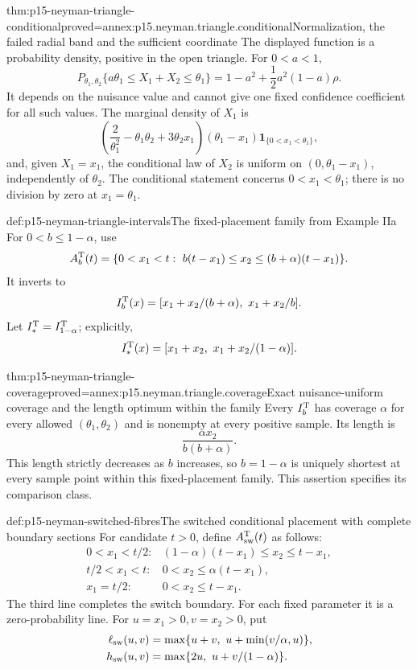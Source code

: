\begin{hbtheorem}{thm:p15-neyman-triangle-conditional}{proved=annex:p15.neyman.triangle.conditional}{Normalization, the failed radial band and the sufficient coordinate}
The displayed function is a probability density, positive in the
open triangle. For \(0<a<1\),
\[
 P_{\theta_1,\theta_2}\{a\theta_1\leq X_1+X_2\leq\theta_1\}
             =1-a^2+\frac12a^2(1-a)\rho.
\]
It depends on the nuisance value and cannot give one fixed
confidence coefficient for all such values.
The marginal density of \(X_1\) is
\[
 \left(\frac2{\theta_1^2}-\theta_1\theta_2+3\theta_2x_1\right)
                      (\theta_1-x_1)\mathbf1_{\{0<x_1<\theta_1\}},
\]
and, given \(X_1=x_1\), the conditional law of \(X_2\) is
uniform on \((0,\theta_1-x_1)\), independently of \(\theta_2\).
The conditional statement concerns \(0<x_1<\theta_1\);
there is no division by zero at \(x_1=\theta_1\).
\end{hbtheorem}

\begin{hbdefinition}{def:p15-neyman-triangle-intervals}{The fixed-placement family from Example IIa}
For \(0<b\leq1-\alpha\), use
\[
 A_b^{\rm T}(t)=
 \{0<x_1<t:\ b(t-x_1)\leq x_2\leq(b+\alpha)(t-x_1)\}.
\]
It inverts to
\[
             I_b^{\rm T}(x)=
                [x_1+x_2/(b+\alpha),\ x_1+x_2/b].
\]
Let \(I_*^{\rm T}=I_{1-\alpha}^{\rm T}\); explicitly,
\[
             I_*^{\rm T}(x)=[x_1+x_2,\ x_1+x_2/(1-\alpha)].
\]
\end{hbdefinition}

\begin{hbtheorem}{thm:p15-neyman-triangle-coverage}{proved=annex:p15.neyman.triangle.coverage}{Exact nuisance-uniform coverage and the length optimum within the family}
Every \(I_b^{\rm T}\) has coverage \(\alpha\) for every allowed
\((\theta_1,\theta_2)\) and is nonempty at every positive sample.
Its length is
\[
                          \frac{\alpha x_2}{b(b+\alpha)}.
\]
This length strictly decreases as \(b\) increases, so \(b=1-\alpha\)
is uniquely shortest at every sample point within this fixed-placement
family. This assertion specifies its comparison class.
\end{hbtheorem}

\begin{hbdefinition}{def:p15-neyman-switched-fibres}{The switched conditional placement with complete boundary sections}
For candidate \(t>0\), define \(A_{\rm sw}^{\rm T}(t)\) as follows:
\[
\begin{array}{ll}
0<x_1<t/2:&(1-\alpha)(t-x_1)\leq x_2\leq t-x_1,\\
t/2<x_1<t:&0<x_2\leq\alpha(t-x_1),\\
x_1=t/2:&0<x_2\leq t-x_1.
\end{array}
\]
The third line completes the switch boundary. For each fixed
parameter it is a zero-probability line.
For \(u=x_1>0,v=x_2>0\), put
\[
\begin{aligned}
 \ell_{\rm sw}(u,v)&=\max\{u+v,\ u+\min(v/\alpha,u)\},\\
 h_{\rm sw}(u,v)&=\max\{2u,\ u+v/(1-\alpha)\}.
\end{aligned}
\]
\end{hbdefinition}

